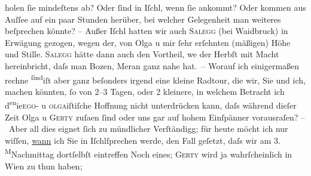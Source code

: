 \begin{ledgroupsized}[t]{13cm}
               holen ſie mindeſtens ab? Oder ſind in Iſchl, wenn
               ſie ankommt? Oder kommen aus Auſſee auf ein paar
               Stunden herüber, bei welcher Gelegenheit man weiteres beſprechen könnte? – Außer Iſchl hatten wir auch \textsc{Salegg} (bei Waidbruck) in {\pb}Erwägung gezogen, wegen der, von Olga u mir ſehr erſehnten (mäßigen) Höhe und Stille. \textsc{Salegg} hätte dann auch den Vortheil, we{\geminationn} der
                  Herbſt mit Macht hereinbricht, daſs man Bozen, Meran ganz nahe hat. –\pend
           \pstart
           Worauf ich einigermaßen rechne \substVorne{}\textsuperscript{ſind}\substDazwischen{}iſt\substHinten{} aber ganz beſonders irgend eine kleine Radtour, die wir, Sie und ich, machen
               könnten, ſo von 2–3 Tagen, oder 2 kleinere, {\pb}in welchem
               Betracht ich d\substVorne{}\textsuperscript{en}\substDazwischen{}ie\substHinten{}{ }\textsc{ego}- u \textsc{olga}iſtiſche Hoffnung nicht unterdrücken kann, daſs während dieſer Zeit Olga u \textsc{Gerty} zuſa{\geminationm}en ſind oder uns gar auf hohem Einſpänner
               vorausraſen?\pend
           \pstart
           – Aber all dies eignet ſich zu mündlicher Verſtändigg; für heute möcht ich nur
               wiſſen, \uline{wann} ich Sie in Iſchlſprechen werde, den Fall geſetzt, daſs wir am
                  3.{ }\substVorne{}\textsuperscript{M}\substDazwischen{}Na\substHinten{}chmittag dortſelbſt eintreffen\pend
           \pstart
           {\pb}Noch eines; \textsc{Gerty} wird ja wahrſcheinlich in Wien zu thun haben;

\end{ledgroupsized}

